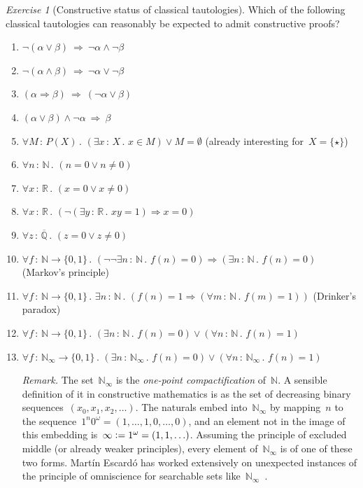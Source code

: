 \documentclass[10pt,reqno,a4paper,openany]{amsbook}
\theoremstyle{definition}
\theoremstyle{plain}
\theoremstyle{remark}
\newcommand{\NN}{\mathbb{N}}
\newcommand{\RR}{\mathbb{R}}
\newcommand{\QQ}{\mathbb{Q}}
\newcommand{\?}{\,{:}\,}
\renewcommand{\_}{\mathpunct{.}\,}
\newcommand{\defeq}{\vcentcolon=}
\newtheorem{exercise}{Exercise}[chapter]
\begin{document}
\begin{exercise}[Constructive status of classical tautologies]\label{ex:tautologies}
Which of the following classical tautologies can reasonably be expected to
admit constructive proofs?
\begin{enumerate}
\item $\neg(\alpha \vee \beta) \ \Longrightarrow\ \neg\alpha \wedge \neg\beta$
\item $\neg(\alpha \wedge \beta) \ \Longrightarrow\ \neg\alpha \vee \neg\beta$
\item $(\alpha \Rightarrow \beta) \ \Longrightarrow\ (\neg\alpha \vee \beta)$
\item $(\alpha \vee \beta) \wedge \neg\alpha \ \Longrightarrow\ \beta$
\item $\forall M\?P(X)\_ (\exists x\?X\_ x \in M) \vee M = \emptyset$
(already interesting for~$X = \{\star\}$)
\item $\forall n\?\NN\_ (n = 0 \vee n \neq 0)$
\item $\forall x\?\RR\_ (x = 0 \vee x \neq 0)$
\item $\forall x\?\RR\_ (\neg(\exists y\?\RR\_ xy=1) \Rightarrow x = 0)$
\item $\forall z\?\overline{\QQ}\_ (z = 0 \vee z \neq 0)$
\item $\forall f \? \NN \to \{0,1\}\_ (\neg\neg\exists n \? \NN\_ f(n) = 0)
\Rightarrow (\exists n \? \NN\_ f(n) = 0)$ (Markov's principle)
\item $\forall f \? \NN \to \{0,1\}\_ \exists n \? \NN\_ (f(n) = 1
\Rightarrow (\forall m \? \NN\_ f(m) = 1))$ (Drinker's paradox)
\item $\forall f \? \NN \to \{0,1\}\_ (\exists n \? \NN\_ f(n) = 0) \vee
(\forall n \? \NN\_ f(n) = 1)$
\item $\forall f \? \NN_\infty \to \{0,1\}\_ (\exists n \? \NN_\infty\_ f(n) = 0) \vee
(\forall n \? \NN_\infty\_ f(n) = 1)$

{\noindent\scriptsize\emph{Remark.} The set~$\NN_\infty$ is the \emph{one-point
compactification} of~$\NN$. A sensible definition of it in constructive mathematics
is as the set of decreasing binary sequences~$(x_0,x_1,x_2,\ldots)$. The
naturals embed into~$\NN_\infty$ by mapping~$n$ to the sequence~$1^n 0^\omega =
(1,\ldots,1,0,\ldots,0)$, and an element not in the image of this embedding
is~$\infty \defeq 1^\omega = (1,1,\ldots)$. Assuming the principle of excluded
middle (or already weaker principles), every element of~$\NN_\infty$ is of one
of these two forms. Martín Escardó has worked extensively on unexpected
instances of the principle of omniscience for searchable sets
like~$\NN_\infty$~\cite{escardo:omniscience1,escardo:omniscience2,escardo:omniscience}.\par}
\end{enumerate}
\end{exercise}
\end{document}
